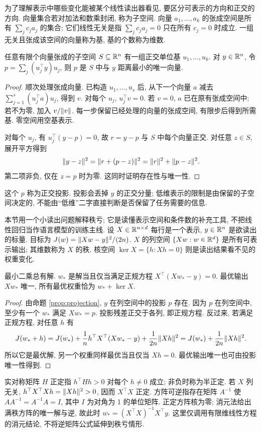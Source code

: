 为了理解表示中哪些变化能被某个线性读出器看见, 要区分可表示的方向和正交的方向. 向量集合若对加法和数乘封闭, 称为子空间. 向量 $a_1,\ldots,a_k$ 的张成空间是所有 $\sum_jc_ja_j$ 的集合; 它们线性无关是指 $\sum_jc_ja_j=0$ 只在所有 $c_j=0$ 时成立. 一组无关且张成该空间的向量称为基, 基的个数称为维数.

\begin{proposition}\label{prop:projection}
任意有限个向量张成的子空间 $S\subseteq\mathbb R^n$ 有一组正交单位基 $u_1,\ldots,u_k$. 对 $y\in\mathbb R^n$, 令 $p=\sum_j(u_j^\top y)u_j$, 则 $p$ 是 $S$ 中与 $y$ 距离最小的唯一向量.
\end{proposition}
\begin{proof}
顺次处理张成向量. 已构造 $u_1,\ldots,u_s$ 后, 从下一个向量 $a$ 减去 $\sum_{j=1}^s(u_j^\top a)u_j$, 得到 $v$. 对每个 $u_j$, $u_j^\top v=0$. 若 $v=0$, $a$ 已在原有张成空间中; 若不为零, 加入 $v/\lVert v\rVert$. 每一步保留已经处理的向量的张成空间, 有限步后得到所需基. 零空间用空基表示.

对每个 $u_j$, 有 $u_j^\top(y-p)=0$, 故 $r=y-p$ 与 $S$ 中每个向量正交. 对任意 $z\in S$, 展开平方得到
\[
\lVert y-z\rVert^2=\lVert r+(p-z)\rVert^2=\lVert r\rVert^2+\lVert p-z\rVert^2.
\]
第二项非负, 仅在 $z=p$ 时为零. 这同时证明存在性与唯一性.
\end{proof}
这个 $p$ 称为正交投影. 投影会丢掉 $y$ 的正交分量; 低维表示的限制是由保留的子空间决定的, 不能由“低维”二字直接判断是否保留了任务需要的信息.

本节用一个小读出问题解释秩亏; 它是读懂表示空间和条件数的补充工具, 不把线性回归当作语言模型的训练主线. 设 $X\in\mathbb R^{n\times d}$ 每行是一个表示, $y\in\mathbb R^n$ 是欲读出的标量. 目标为 $J(w)=\lVert Xw-y\rVert^2/(2n)$. $X$ 的列空间 $\{Xw:w\in\mathbb R^d\}$ 是所有可表示输出; 其维数称为 $X$ 的秩. 核空间 $\ker X=\{h:Xh=0\}$ 则是读出结果看不见的权重变化.

\begin{proposition}
最小二乘总有解. $w_*$ 是解当且仅当满足正规方程 $X^\top(Xw_*-y)=0$. 最优输出 $Xw_*$ 唯一, 所有最优权重恰为 $w_*+\ker X$.
\end{proposition}
\begin{proof}
由命题 \ref{prop:projection}, $y$ 在列空间中的投影 $p$ 存在. 因为 $p$ 在列空间中, 至少有一个 $w_*$ 满足 $Xw_*=p$. 投影残差正交于各列, 即正规方程. 反过来, 若满足正规方程, 对任意 $h$ 有
\[
J(w_*+h)=J(w_*)+\frac1n h^\top X^\top(Xw_*-y)
+\frac1{2n}\lVert Xh\rVert^2=J(w_*)+\frac1{2n}\lVert Xh\rVert^2.
\]
所以它是最优解, 另一个权重同样最优当且仅当 $Xh=0$. 最优输出唯一也可由投影唯一性得到.
\end{proof}
实对称矩阵 $H$ 正定指 $h^\top Hh>0$ 对每个 $h\ne0$ 成立; 非负时称为半正定. 若 $X$ 列无关, $h^\top X^\top Xh=\lVert Xh\rVert^2>0$, 因而 $X^\top X$ 正定. 方阵可逆指存在矩阵 $A^{-1}$ 使 $AA^{-1}=A^{-1}A=I$, 其中 $I$ 为对角为 1 的单位矩阵. 正定方阵核为零; 消元法给出满秩方阵的唯一解与逆, 故此时 $w_*=(X^\top X)^{-1}X^\top y$. 这里仅调用有限维线性方程的消元结论, 不将逆矩阵公式延伸到秩亏情形.

